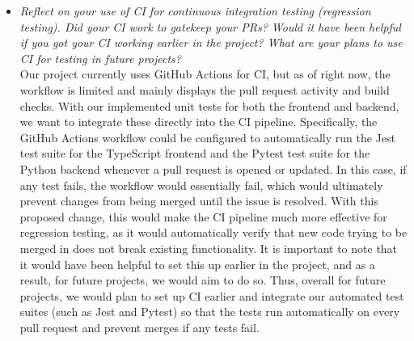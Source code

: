 \documentclass[12pt, titlepage]{article}
\begin{document}
\begin{itemize}
          Our VnV Plan deviated from the activities that were actually conducted in a few notable ways. The original 
      plan outlined testing at a higher level of abstraction, targeting broader system functionalities rather than 
      individual module functions. As development progressed and the codebase became more detailed, it became clear 
      that more granular unit tests were necessary. This also coincided with our team further subdividing some of 
      the modules during implementation, which resulted in more detailed tests being required. This led to the 
      addition of the User Account module test suite, which did not exist in the original plan at all. As this 
      module grew in scope and became central to both patient and PT workflows, dedicated testing for functions 
      such as \texttt{getUserData()}, \texttt{updateUser()}, and \texttt{deletePTAccount()} became essential.
      The usability testing itself proceeded largely as planned, though the participant pool was smaller than 
      initially intended due to scheduling constraints. The structured questionnaire format, pre-session, session, 
      and post-session, was maintained as designed and provided consistent data across all five participants.

      


  \item \textit{Reflect on your use of CI for continuous integration testing (regression
  testing). Did your CI work to gatekeep your PRs?  Would it have been helpful
  if you got your CI working earlier in the project?  What are your plans to use
  CI for testing in future projects?} \\

    Our project currently uses GitHub Actions for CI, but as of right now, the workflow is limited and 
    mainly displays the pull request activity and build checks. With our implemented unit tests for both 
    the frontend and backend, we want to integrate these directly into the CI pipeline. Specifically, the 
    GitHub Actions workflow could be configured to automatically run the Jest test suite for the TypeScript 
    frontend and the Pytest test suite for the Python backend whenever a pull request is opened or updated. 
    In this case, if any test fails, the workflow would essentially fail, which would ultimately prevent changes 
    from being merged until the issue is resolved. With this proposed change, this would make the CI pipeline much 
    more effective for regression testing, as it would automatically verify that new code trying to be merged in 
    does not break existing functionality. It is important to note that it would have been helpful to set this up 
    earlier in the project, and as a result, for future projects, we would aim to do so. Thus, overall for future 
    projects, we would plan to set up CI earlier and integrate our automated test suites (such as Jest and Pytest) 
    so that the tests run automatically on every pull request and prevent merges if any tests fail.


\end{itemize}
\end{document}
